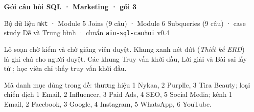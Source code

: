 \documentclass[11pt,a4paper]{article}
\begin{document}
{\LARGE\bfseries Gói câu hỏi SQL · Marketing · gói 3\par}
\medskip
{\color{cqMuted}Bộ dữ liệu \texttt{mkt} · Module 5 Joins (9 câu) · Module 6 Subqueries (9 câu) · case study Dễ và Trung bình · chuẩn \texttt{aio-sql-cauhoi} v0.4\par}
\bigskip
Lô soạn chờ kiểm và chờ giảng viên duyệt. Khung xanh nét đứt (\emph{Thiết kế ERD}) là ghi chú cho người duyệt. Các khung Truy vấn khởi đầu, Lời giải và Bài sai lấy từ ; học viên chỉ thấy truy vấn khởi đầu.

Mã danh mục dùng trong đề: thương hiệu  1 Nykaa, 2 Purplle, 3 Tira Beauty; loại chiến dịch  1 Email, 2 Influencer, 3 Paid Ads, 4 SEO, 5 Social Media; kênh  1 Email, 2 Facebook, 3 Google, 4 Instagram, 5 WhatsApp, 6 YouTube.

\tableofcontents


\end{document}
